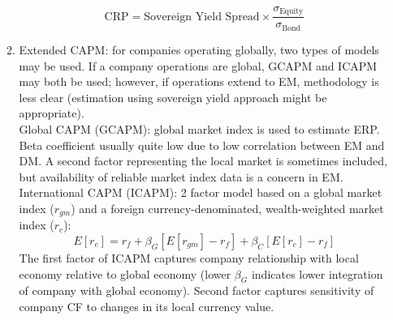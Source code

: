 \begin{method}
\begin{enumerate}[label=\roman*.]
\begin{enumerate}[label=\arabic*.]
\begin{equation}
\text{CRP} = \text{Sovereign Yield Spread} \times \frac{\sigma_{\text{Equity}}}{\sigma_{\text{Bond}}} \nonumber
\end{equation}
\item Extended CAPM: for companies operating globally, two types of models may be used. If a company operations are global, GCAPM and ICAPM may both be used; however, if operations extend to EM, methodology is less clear (estimation using sovereign yield approach might be appropriate). \\
Global CAPM (GCAPM): global market index is used to estimate ERP. Beta coefficient usually quite low due to low correlation between EM and DM. A second factor representing the local market is sometimes included, but availability of reliable market index data is a concern in EM.\\
International CAPM (ICAPM): 2 factor model based on a global market index ($r_{gm}$) and a foreign currency-denominated, wealth-weighted market index ($r_c$):
\begin{equation}
E[r_e] = r_f + \beta_{G}[E[r_{gm}] - r_f] + \beta_{C}[E[r_c] - r_f] \nonumber
\end{equation}
The first factor of ICAPM captures company relationship with local economy relative to global economy (lower $\beta_{G}$ indicates lower integration of company with global economy). Second factor captures sensitivity of company CF to changes in its local currency value.\\
\end{enumerate}
\end{enumerate}
\end{method}
